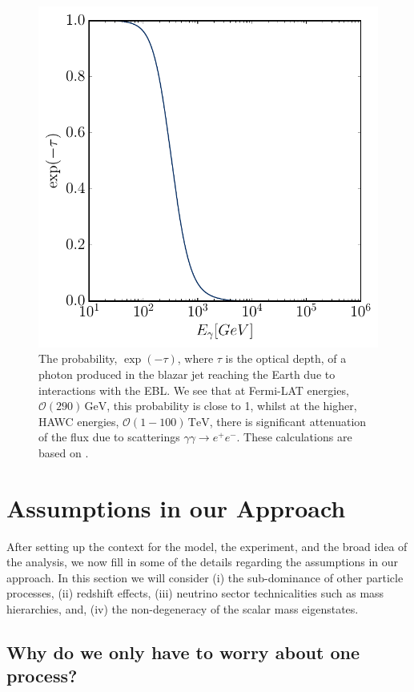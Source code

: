 \documentclass[11pt]{article}
\numberwithin{equation}{section}
\numberwithin{figure}{section}
\numberwithin{table}{section}
\newcommand{\mO}{\mathcal{O}}
\begin{document}
\begin{figure}[t]
 \centering
 \includegraphics[width=.5\textwidth]{ebl.pdf}
 \caption{The probability, $\exp(-\tau)$, where $\tau$ is the optical depth, of a photon produced in the blazar jet reaching the Earth due to interactions with the EBL. We see that at Fermi-LAT energies, $\mO(290) \, \mathrm{GeV}$, this probability is close to 1, whilst at the higher, HAWC energies, $\mO(1 - 100) \, \mathrm{TeV}$, there is significant attenuation of the flux due to scatterings $\gamma\gamma \rightarrow e^{+}e^{-}$. These calculations are based on \cite{DeLavallaz:2011ju}.}
 \label{fig:ebl}
\end{figure}


\section{Assumptions in our Approach}\label{sec:assumptions}



After setting up the context for the model, the experiment, and the broad idea of the analysis, we now fill in some of the details regarding the assumptions in our approach. In this section we will consider (i) the sub-dominance of other particle processes, (ii) redshift effects, (iii) neutrino sector technicalities such as mass hierarchies, and, (iv) the non-degeneracy of the scalar mass eigenstates.



\subsection{Why do we only have to worry about one process?}\label{sec:oneprocess}
\end{document}
